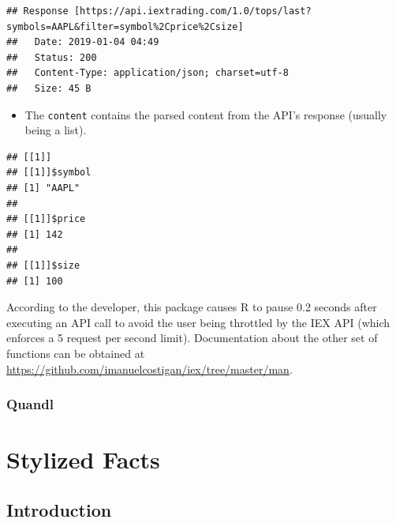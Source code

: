 \documentclass[]{book}
\newenvironment{Shaded}{\begin{snugshade}}{\end{snugshade}}
\newcommand{\OperatorTok}[1]{\textcolor[rgb]{0.81,0.36,0.00}{\textbf{#1}}}
\newcommand{\NormalTok}[1]{#1}
\providecommand{\tightlist}{%
  \setlength{\itemsep}{0pt}\setlength{\parskip}{0pt}}
\begin{document}
\begin{Shaded}
\end{Shaded}

\begin{verbatim}
## Response [https://api.iextrading.com/1.0/tops/last?symbols=AAPL&filter=symbol%2Cprice%2Csize]
##   Date: 2019-01-04 04:49
##   Status: 200
##   Content-Type: application/json; charset=utf-8
##   Size: 45 B
\end{verbatim}

\begin{itemize}
\tightlist
\item
  The \texttt{content} contains the parsed content from the API's
  response (usually being a list).
\end{itemize}

\begin{Shaded}
\end{Shaded}

\begin{verbatim}
## [[1]]
## [[1]]$symbol
## [1] "AAPL"
## 
## [[1]]$price
## [1] 142
## 
## [[1]]$size
## [1] 100
\end{verbatim}

According to the developer, this package causes R to pause 0.2 seconds
after executing an API call to avoid the user being throttled by the IEX
API (which enforces a 5 request per second limit). Documentation about
the other set of functions can be obtained at
\url{https://github.com/imanuelcostigan/iex/tree/master/man}.

\subsection{Quandl}\label{quandl}

\chapter{Stylized Facts}\label{stylized-facts}

\section{Introduction}\label{introduction}
\end{document}
